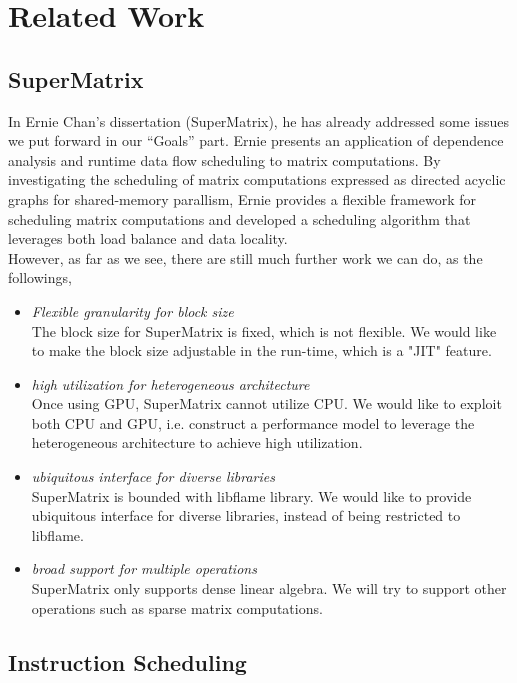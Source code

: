 \documentclass[preprint,11pt]{elsarticle}
\begin{document}
\section{Related Work}


\subsection{SuperMatrix}
In Ernie Chan’s dissertation (SuperMatrix), he has already addressed some issues we put forward in our “Goals” part. Ernie presents an application of dependence analysis and runtime data flow scheduling to matrix computations. By investigating the scheduling of matrix computations expressed as directed acyclic graphs for shared-memory parallism, Ernie provides a flexible framework for scheduling matrix computations and developed a scheduling algorithm that leverages both load balance and data locality.\\
However, as far as we see, there are still much further work we can do, as the followings,
\begin{itemize}
	\item \emph{Flexible granularity for block size}\\
		The block size for SuperMatrix is fixed, which is not flexible. We would like to make the block size adjustable in the run-time, which is a "JIT" feature.
	\item \emph{high utilization for heterogeneous architecture}\\
		Once using GPU, SuperMatrix cannot utilize CPU. We would like to exploit both CPU and GPU, i.e. construct a performance model to leverage the heterogeneous architecture to achieve high utilization.
	\item \emph{ubiquitous interface for diverse libraries}\\
		SuperMatrix is bounded with libflame library. We would like to provide ubiquitous interface for diverse libraries, instead of being restricted to libflame.
	\item \emph{broad support for multiple operations}\\
		SuperMatrix only supports dense linear algebra. We will try to support other operations such as sparse matrix computations.
\
\end{itemize}

\subsection{Instruction Scheduling}
\end{document}
